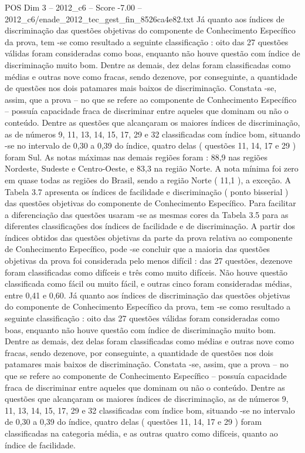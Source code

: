 \begin{textsample}{POS Dim 3 – 2012\_c6 – Score -7.00 – 2012\_c6/enade\_2012\_tec\_gest\_fin\_8526ca4e82.txt}
Já quanto aos índices de discriminação das questões objetivas do componente de Conhecimento Específico da prova, tem -se como resultado a seguinte classificação : oito das 27 questões válidas foram consideradas como boas, enquanto não houve questão com índice de discriminação muito bom.
Dentre as demais, dez delas foram classificadas como médias e outras nove como fracas, sendo dezenove, por conseguinte, a quantidade de questões nos dois patamares mais baixos de discriminação.
Constata -se, assim, que a prova – no que se refere ao componente de Conhecimento Específico – possuía capacidade fraca de discriminar entre aqueles que dominam ou não o conteúdo.
Dentre as questões que alcançaram os maiores índices de discriminação, as de números 9, 11, 13, 14, 15, 17, 29 e 32 classificadas com índice bom, situando -se no intervalo de 0,30 a 0,39 do índice, quatro delas ( questões 11, 14, 17 e 29 ) foram Sul.
As notas máximas nas demais regiões foram : 88,9 nas regiões Nordeste, Sudeste e Centro-Oeste, e 83,3 na região Norte.
A nota mínima foi zero em quase todas as regiões do Brasil, sendo a região Norte ( 11,1 ), a exceção.
A Tabela 3.7 apresenta os índices de facilidade e discriminação ( ponto bisserial ) das questões objetivas do componente de Conhecimento Específico.
Para facilitar a diferenciação das questões usaram -se as mesmas cores da Tabela 3.5 para as diferentes classificações dos índices de facilidade e de discriminação.
A partir dos índices obtidos das questões objetivas da parte da prova relativa ao componente de Conhecimento Específico, pode -se concluir que a maioria das questões objetivas da prova foi considerada pelo menos difícil : das 27 questões, dezenove foram classificadas como difíceis e três como muito difíceis.
Não houve questão classificada como fácil ou muito fácil, e outras cinco foram consideradas médias, entre 0,41 e 0,60.
Já quanto aos índices de discriminação das questões objetivas do componente de Conhecimento Específico da prova, tem -se como resultado a seguinte classificação : oito das 27 questões válidas foram consideradas como boas, enquanto não houve questão com índice de discriminação muito bom.
Dentre as demais, dez delas foram classificadas como médias e outras nove como fracas, sendo dezenove, por conseguinte, a quantidade de questões nos dois patamares mais baixos de discriminação.
Constata -se, assim, que a prova – no que se refere ao componente de Conhecimento Específico – possuía capacidade fraca de discriminar entre aqueles que dominam ou não o conteúdo.
Dentre as questões que alcançaram os maiores índices de discriminação, as de números 9, 11, 13, 14, 15, 17, 29 e 32 classificadas com índice bom, situando -se no intervalo de 0,30 a 0,39 do índice, quatro delas ( questões 11, 14, 17 e 29 ) foram classificadas na categoria média, e as outras quatro como difíceis, quanto ao índice de facilidade.

\end{textsample}
